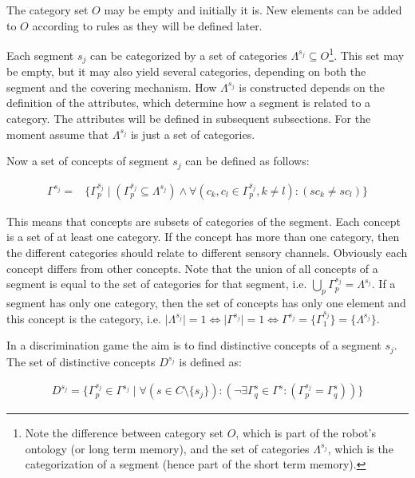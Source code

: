 The category set $O$ may be empty and initially it is. New elements can be added to $O$ according to rules as they will be defined later.

Each segment $s_j$ can be categorized by a set of categories $\Lambda^{s_j} \subseteq O$\footnote{Note the difference between category set $O$, which is part of the robot's ontology (or long term memory), and the set of categories $\Lambda^{s_j}$, which is the categorization of a segment (hence part of the short term memory).}. This set may be empty, but it may also yield several categories, depending on both the segment and the covering mechanism. How $\Lambda^{s_j}$ is constructed depends on the definition of the attributes, which determine how a segment is related to a category. The attributes will be defined in subsequent subsections. For the moment assume that $\Lambda^{s_j}$ is just a set of categories.

Now a set of concepts of segment $s_j$ can be defined as follows:

\begin{eqnarray}
\Gamma^{s_j}=&\{\Gamma^{s_j}_p \mid (\Gamma^{s_j}_p \subseteq \Lambda^{s_j}) \wedge \forall (c_k, c_l \in \Gamma^{s_j}_p, k \neq l) : (sc_k \neq sc_l) \}
\end{eqnarray}

\n
This means that concepts are subsets of categories of the segment. Each concept is a set of at least one category. If the concept has more than one category, then the different categories should relate to different sensory channels. Obviously each concept differs from other concepts. Note that the union of all concepts of a segment is equal to the set of categories for that segment, i.e. $\bigcup_p \Gamma^{s_j}_p = \Lambda^{s_j}$. If a segment has only one category, then the set of concepts has only one element and this concept is the category, i.e. $\mid\Lambda^{s_j}\mid=1 \Leftrightarrow \mid\Gamma^{s_j}\mid=1 \Leftrightarrow \Gamma^{s_j}= \{\Gamma^{s_j}_1\} = \{\Lambda^{s_j}\}$.

\p
In a discrimination game the aim is to find distinctive concepts of a segment $s_j$. The set of distinctive concepts $D^{s_j}$ is defined as:

\begin{eqnarray}
D^{s_j}=\{\Gamma^{s_j}_{p} \in \Gamma^{s_j} \mid \forall (s \in C\setminus\{s_j\}):(\neg \exists \Gamma^{s}_q\in\Gamma^{s}: (\Gamma^{s_j}_p=\Gamma^{s}_q))\}
\end{eqnarray}

